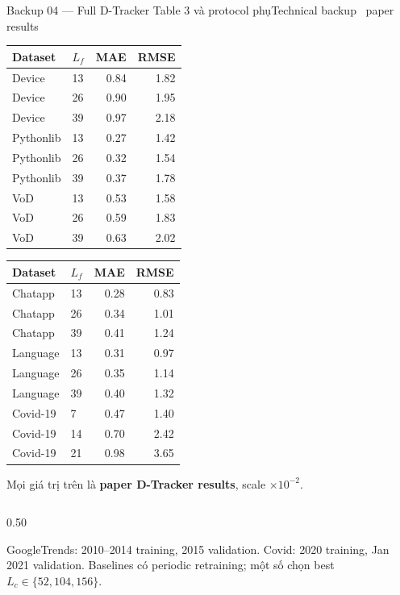 \begin{frame}[shrink=24]{Backup 04 --- Full D-Tracker Table 3 và protocol phụ}{Technical backup \textperiodcentered\ paper results}
\centering
{\fontsize{7.2}{8.3}\selectfont
\begin{tabular}{@{}llrr@{}}
  \toprule
  Dataset & $L_f$ & MAE & RMSE\\
  \midrule
  Device & 13 & 0.84 & 1.82\\
  Device & 26 & 0.90 & 1.95\\
  Device & 39 & 0.97 & 2.18\\
  Pythonlib & 13 & 0.27 & 1.42\\
  Pythonlib & 26 & 0.32 & 1.54\\
  Pythonlib & 39 & 0.37 & 1.78\\
  VoD & 13 & 0.53 & 1.58\\
  VoD & 26 & 0.59 & 1.83\\
  VoD & 39 & 0.63 & 2.02\\
  \bottomrule
\end{tabular}\qquad
\begin{tabular}{@{}llrr@{}}
  \toprule
  Dataset & $L_f$ & MAE & RMSE\\
  \midrule
  Chatapp & 13 & 0.28 & 0.83\\
  Chatapp & 26 & 0.34 & 1.01\\
  Chatapp & 39 & 0.41 & 1.24\\
  Language & 13 & 0.31 & 0.97\\
  Language & 26 & 0.35 & 1.14\\
  Language & 39 & 0.40 & 1.32\\
  Covid-19 & 7 & 0.47 & 1.40\\
  Covid-19 & 14 & 0.70 & 2.42\\
  Covid-19 & 21 & 0.98 & 3.65\\
  \bottomrule
\end{tabular}}
\vspace{3mm}
{\small Mọi giá trị trên là \textbf{paper D-Tracker results}, scale $\times10^{-2}$.}
\vspace{3mm}
\begin{columns}[T,onlytextwidth]
\begin{column}{0.50\textwidth}
\begin{intuition}
  GoogleTrends: 2010--2014 training, 2015 validation. Covid: 2020 training, Jan 2021 validation. Baselines có periodic retraining; một số chọn best $L_c\in\{52,104,156\}$.

\end{intuition}
\end{column}
\end{columns}
\end{frame}
